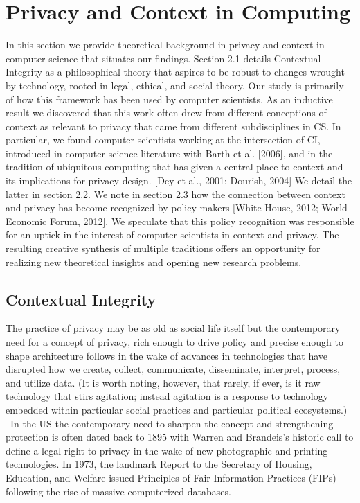 \documentclass[../thesis.tex]{subfiles}
\begin{document}
\section{Privacy and Context in Computing}
\label{CI2}

\textcolor[rgb]{0.2,0.2,0.2}{In this section we provide theoretical
background in privacy and context in computer science that situates our
findings. Section 2.1 details Contextual Integrity as a philosophical
theory that aspires to be robust to changes wrought by technology,
rooted in legal, ethical, and social theory. Our study is primarily of
how this framework has been used by computer scientists. As an
inductive result we discovered that this work often drew from different
conceptions of context as relevant to privacy that came from different
subdisciplines in CS. In particular, we found computer scientists
working at the intersection of CI, introduced in computer science
literature with Barth et al. [2006], and in the tradition of ubiquitous
computing that has given a central place to context and its
implications for privacy design. [Dey et al., 2001; Dourish, 2004] We
detail the latter in section 2.2. We note in section 2.3 how the
connection between context and privacy has become recognized by
policy-makers} [White House, 2012; World Economic Forum, 2012]. We
speculate that this policy recognition was responsible for an uptick in
the interest of computer scientists in context and
privacy.\textcolor[rgb]{0.2,0.2,0.2}{ The resulting creative synthesis
of multiple traditions offers an opportunity for realizing new
theoretical insights and opening new research problems.}

\subsection{Contextual Integrity}
\label{CI2.1}

The practice of privacy may be as old as social life itself but the
contemporary need for a concept of privacy, rich enough to drive policy
and precise enough to shape architecture follows in the wake of
advances in technologies that have disrupted how we create, collect,
communicate, disseminate, interpret, process, and utilize data. (It is
worth noting, however, that rarely, if ever, is it raw technology that
stirs agitation; instead agitation is a response to technology embedded
within particular social practices and particular political
ecosystems.) \ In the US the contemporary need to sharpen the concept
and strengthening protection is often dated back to 1895 with Warren
and Brandeis's historic call to define a legal right to
privacy in the wake of new photographic and printing technologies. In
1973, the landmark Report to the Secretary of Housing, Education, and
Welfare issued Principles of Fair Information Practices (FIPs)
following the rise of massive computerized databases. 
\end{document}
